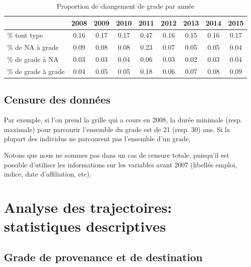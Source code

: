 \documentclass[11pt,a4paper]{article}
\begin{document}
\begin{table}[h!]
\centering
\caption{Proportion de changement de grade par année} 
\label{filters}
\begin{tabular}{lcccccccc}
\toprule
 & 2008 & 2009 & 2010 & 2011 & 2012 & 2013 & 2014 & 2015 \\ 
  \hline
\% tout type & 0.16 & 0.17 & 0.17 & 0.47 & 0.16 & 0.15 & 0.16 & 0.17 \\ 
\midrule
  \% de NA à grade & 0.09 & 0.08 & 0.08 & 0.23 & 0.07 & 0.05 & 0.05 & 0.04 \\ 
  \% de grade à NA & 0.03 & 0.03 & 0.04 & 0.06 & 0.03 & 0.02 & 0.03 & 0.04 \\ 
  \% de grade à grade & 0.04 & 0.05 & 0.05 & 0.18 & 0.06 & 0.07 & 0.08 & 0.09 \\ 
\bottomrule
\end{tabular}
\end{table}






\subsection{Censure des données}

Par exemple, si l'on prend la grille qui a cours en 2008, la durée minimale (resp. maximale) pour parcourir l'ensemble du grade est de 21 (resp. 30) ans. Si la plupart des individus ne parcourent pas l'ensemble d'un grade, 

Notons que nous ne sommes pas dans un cas de censure totale, puisqu'il est possible d'utiliser les informations sur les variables avant 2007 (libellés emploi, indice, date d'affiliation, etc). 





\section{Analyse des trajectoires: statistiques descriptives}

\subsection{Grade de provenance et de destination}
\end{document}
